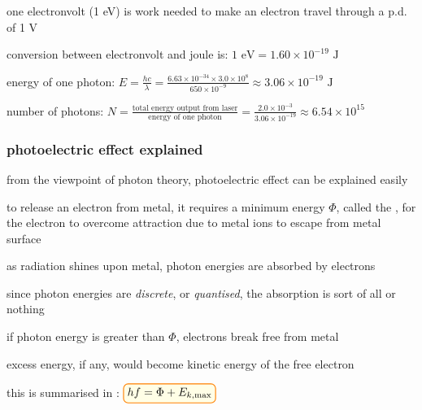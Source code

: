 one electronvolt (1 eV) is work needed to make an electron travel through a p.d. of 1 V

conversion between electronvolt and joule is: $\boxed{1 \text{ eV} = 1.60\times10^{-19} \text{ J}}$

\label{ex-redlaser}

\sol energy of one photon: $E = \frac{hc}{\lambda} = \frac{6.63\times10^{-34}\times3.0\times10^8}{650 \times10^{-9}} \approx 3.06\times10^{-19} \text{ J}$

\eqyskip number of photons: $N = \frac{\text{total energy output from laser}}{\text{energy of one photon}} = \frac{2.0\times10^{-3}}{3.06\times10^{-19}} \approx 6.54\times10^{15}$ \eoe






\subsubsection{photoelectric effect explained}

from the viewpoint of photon theory, photoelectric effect can be explained easily

to release an electron from metal, it requires a minimum energy $\Phi$, called the , for the electron to overcome attraction due to metal ions to escape from metal surface

as radiation shines upon metal, photon energies are absorbed by electrons

since photon energies are \emph{discrete}, or \emph{quantised}, the absorption is sort of all or nothing

if photon energy is greater than $\Phi$, electrons break free from metal

excess energy, if any, would become kinetic energy of the free electron

this is summarised in : $\boxed{hf = \Phi + E_{k,\tmax}}$

